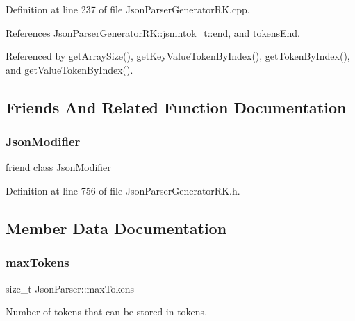 Definition at line 237 of file Json\+Parser\+Generator\+R\+K.\+cpp.



References Json\+Parser\+Generator\+R\+K\+::jsmntok\+\_\+t\+::end, and tokens\+End.



Referenced by get\+Array\+Size(), get\+Key\+Value\+Token\+By\+Index(), get\+Token\+By\+Index(), and get\+Value\+Token\+By\+Index().



\subsection{Friends And Related Function Documentation}
\mbox{\label{class_json_parser_a26df0cdb3650a4a46921ba1793ecfd03}} 
\subsubsection{\texorpdfstring{Json\+Modifier}{JsonModifier}}
{\footnotesize\ttfamily friend class \hyperlink{class_json_modifier}{Json\+Modifier}\hspace{0.3cm}{\ttfamily [friend]}}



Definition at line 756 of file Json\+Parser\+Generator\+R\+K.\+h.



\subsection{Member Data Documentation}
\mbox{\label{class_json_parser_a0dfa97de05bac37c5be2e1ee9747b8a2}} 
\subsubsection{\texorpdfstring{max\+Tokens}{maxTokens}}
{\footnotesize\ttfamily size\+\_\+t Json\+Parser\+::max\+Tokens\hspace{0.3cm}{\ttfamily [protected]}}



Number of tokens that can be stored in tokens. 



